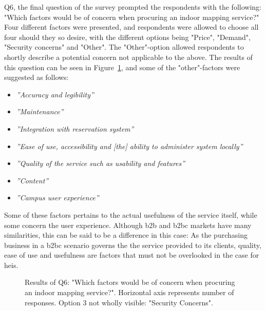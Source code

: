 Q6, the final question of the survey prompted the respondents with the following: "Which factors would be of concern when procuring an indoor mapping service?" Four different factors were presented, and respondents were allowed to choose all four should they so desire, with the different options being "Price", "Demand", "Security concerns" and "Other". The "Other"-option allowed respondents to shortly describe a potential concern not applicable to the above. The results of this question can be seen in Figure~\ref{fig:q6}, and some of the "other"-factors were suggested as follows:
\begin{itemize}
    \item \textit{''Accuracy and legibility''}
    \item \textit{''Maintenance''}
    \item \textit{''Integration with reservation system''}
    \item \textit{''Ease of use, accessibility and [the] ability to administer system locally''}
    \item \textit{''Quality of the service such as usability and features''}
    \item \textit{''Content''}
    \item \textit{''Campus user experience''}
\end{itemize}
\newpage
Some of these factors pertains to the actual usefulness of the service itself, while some concern the user experience. Although \gls{b2b} and \gls{b2bc} markets have many similarities, this can be said to be a difference in this case: As the purchasing business in a \gls{b2bc} scenario governs the the service provided to its clients, quality, ease of use and usefulness are factors that must not be overlooked in the case for \glspl{hei}.



\begin{figure}[H]
    \centering
    \caption{Results of Q6: "Which factors would be of concern when procuring an indoor mapping service?". Horizontal axis represents number of responses. Option 3 not wholly visible: "Security Concerns".}
    \label{fig:q6}
\end{figure}

